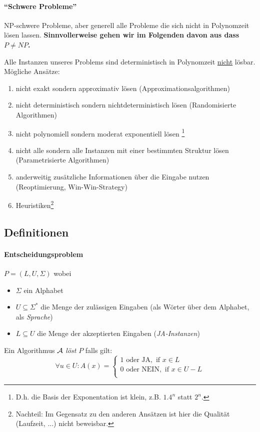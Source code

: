 \paragraph{``Schwere Probleme''}
NP-schwere Probleme, aber generell alle Probleme die sich nicht in Polynomzeit lösen lassen.
\textbf{Sinnvollerweise gehen wir im Folgenden davon aus dass $P \neq NP$.}

Alle Instanzen unseres Problems sind deterministisch in Polynomzeit \underline{nicht} lösbar.
Mögliche Ansätze:
\begin{enumerate}[label=\alph*)]
    \item nicht exakt sondern approximativ lösen (Approximationsalgorithmen)
    \item nicht deterministisch sondern nichtdeterministisch lösen (Randomisierte Algorithmen)
    \item nicht polynomiell sondern moderat exponentiell lösen%
    \footnote{D.h. die Basis der Exponentation ist klein, z.B. $1.4^n$ statt $2^n$.}
    \item nicht alle sondern alle Instanzen mit einer bestimmten Struktur lösen (Parametrisierte Algorithmen)
    \item anderweitig zusätzliche Informationen über die Eingabe nutzen (Reoptimierung, Win-Win-Strategy)
    \item Heuristiken\footnote{Nachteil: Im Gegensatz zu den anderen Ansätzen ist hier die Qualität (Laufzeit, ...) nicht beweisbar.}
\end{enumerate}


\subsection{Definitionen}

\paragraph{Entscheidungsproblem}
$P = (L, U, \Sigma)$ wobei
\begin{itemize}
    \item $\Sigma$ ein Alphabet
    \item $U \subseteq \Sigma^*$ die Menge der zulässigen Eingaben (als Wörter über dem Alphabet, als \emph{Sprache})
    \item $L \subseteq U$ die Menge der akzeptierten Eingaben (\emph{JA-Instanzen})
\end{itemize}
Ein Algorithmus $\mathcal{A}$ \emph{löst} $P$ falls gilt:
$$ \forall u \in U : A(x) =
\begin{cases}
1 \text{ oder JA}, \text{ if } x \in L \\
0 \text{ oder NEIN}, \text{ if } x \in U-L \\
\end{cases}
$$

